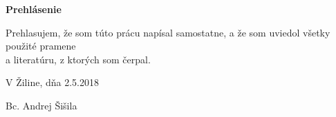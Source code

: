 \centerline{\bf Prehlásenie}

\vspace{2em}

\noindent
Prehlasujem, že som túto prácu napísal samostatne, a že som uviedol všetky použité pramene \\a literatúru, z ktorých som čerpal. 

\vspace{2em}

\noindent

V Žiline, dňa 2.5.2018

\hfill

Bc. Andrej Šišila
